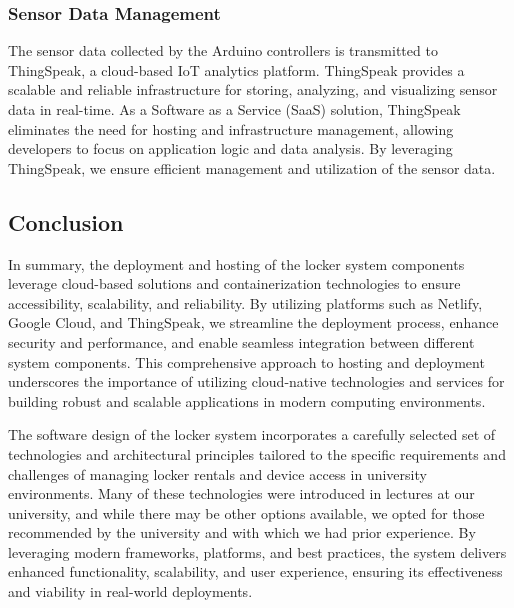 \subsubsection{Sensor Data Management}
The sensor data collected by the Arduino controllers is transmitted to ThingSpeak, a cloud-based IoT analytics platform. ThingSpeak provides a scalable and reliable infrastructure for storing, analyzing, and visualizing sensor data in real-time. As a Software as a Service (SaaS) solution, ThingSpeak eliminates the need for hosting and infrastructure management, allowing developers to focus on application logic and data analysis. By leveraging ThingSpeak, we ensure efficient management and utilization of the sensor data.

\subsection{Conclusion}
In summary, the deployment and hosting of the locker system components leverage cloud-based solutions and containerization technologies to ensure accessibility, scalability, and reliability. By utilizing platforms such as Netlify, Google Cloud, and ThingSpeak, we streamline the deployment process, enhance security and performance, and enable seamless integration between different system components. This comprehensive approach to hosting and deployment underscores the importance of utilizing cloud-native technologies and services for building robust and scalable applications in modern computing environments.

The software design of the locker system incorporates a carefully selected set of technologies and architectural principles tailored to the specific requirements and challenges of managing locker rentals and device access in university environments. Many of these technologies were introduced in lectures at our university, and while there may be other options available, we opted for those recommended by the university and with which we had prior experience. By leveraging modern frameworks, platforms, and best practices, the system delivers enhanced functionality, scalability, and user experience, ensuring its effectiveness and viability in real-world deployments.